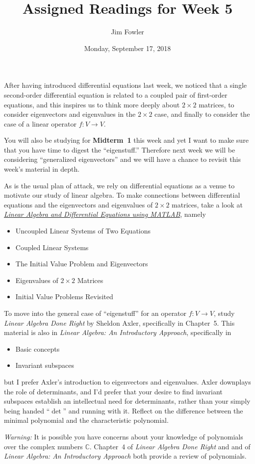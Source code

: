 \documentclass{homework}
\author{Jim Fowler}
\title{Assigned Readings for Week 5}
\date{Monday, September 17, 2018}
\begin{document}
\maketitle

After having introduced differential equations last week, we noticed
that a single second-order differential equation is related to a
coupled pair of first-order equations, and this inspires us to think
more deeply about $2 \times 2$ matrices, to consider eigenvectors and
eigenvalues in the $2 \times 2$ case, and finally to consider the case
of a linear operator $f : V \to V$.

You will also be studying for \textbf{Midterm~1} this week and yet I
want to make sure that you have time to digest the ``eigenstuff.''
Therefore next week we will be considering ``generalized
eigenvectors'' and we will have a chance to revisit this week's
material in depth.

As is the usual plan of attack, we rely on differential equations as a
venue to motivate our study of linear algebra.  To make connections
between differential equations and the eigenvectors and eigenvalues of
$2 \times 2$ matrices, take a look at
\textit{\href{/courses/43735/files/folder/textbooks}{Linear Algebra
    and Differential Equations using MATLAB}}, namely
\begin{itemize}
\item {} Uncoupled Linear Systems of Two Equations
\item {} Coupled Linear Systems
\item {} The Initial Value Problem and Eigenvectors
\item {} Eigenvalues of $2\times 2$ Matrices
\item {} Initial Value Problems Revisited  
\end{itemize}

To move into the general case of ``eigenstuff'' for an operator
$f : V \to V$, study \textit{Linear Algebra Done Right} by Sheldon
Axler, specifically in Chapter~5.  This material is also in
\textit{Linear Algebra: An Introductory Approach}, specifically in
\begin{itemize}
\item {} Basic concepts
\item {} Invariant subspaces
\end{itemize}
but I prefer Axler's introduction to eigenvectors and eigenvalues.
Axler downplays the role of determinants, and I'd prefer that your
desire to find invariant subspaces establish an intellectual need for
determinants, rather than your simply being handed ``$\det$'' and
running with it.  Reflect on the difference between the minimal
polynomial and the characteristic polynomial.

\textit{Warning:} It is possible you have concerns about your
knowledge of polynomials over the complex numbers $\mathbb{C}$.
Chapter~4 of \textit{Linear Algebra Done Right} and 
and  of \textit{Linear Algebra: An Introductory
  Approach} both provide a review of polynomials.
\end{document}
